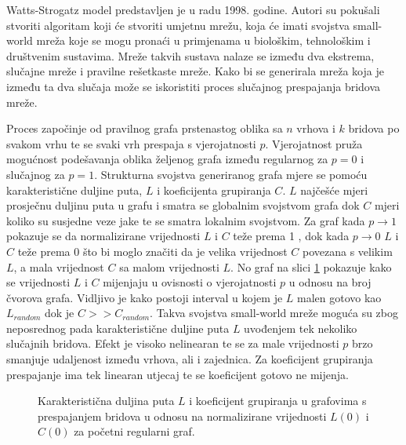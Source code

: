 Watts-Strogatz model predstavljen je u radu \cite{watts1998collective} 1998. godine. Autori su pokušali stvoriti algoritam koji će stvoriti umjetnu mrežu, koja će imati svojstva small-world mreža koje se mogu pronaći u primjenama u biološkim, tehnološkim i društvenim sustavima. Mreže takvih sustava nalaze se između dva ekstrema, slučajne mreže i pravilne rešetkaste mreže. Kako bi se generirala mreža koja je između ta dva slučaja može se iskoristiti proces slučajnog prespajanja bridova mreže. 

Proces započinje od pravilnog grafa prstenastog oblika sa $n$ vrhova i $k$ bridova po svakom vrhu te se svaki vrh prespaja s vjerojatnosti $p$. Vjerojatnost pruža mogućnost podešavanja oblika željenog grafa između regularnog za $p = 0$ i slučajnog za $p = 1$. Strukturna svojstva generiranog grafa mjere se pomoću karakteristične duljine puta, $L$ i koeficijenta grupiranja $C$. $L$ najčešće mjeri prosječnu duljinu puta u grafu i smatra se globalnim svojstvom grafa dok $C$ mjeri koliko su susjedne veze jake te se smatra lokalnim svojstvom. Za graf kada $p \rightarrow 1$ pokazuje se da normalizirane vrijednosti $L$ i $C$ teže prema 1 , dok kada $p \rightarrow 0$ $L$ i $C$ teže prema 0 što bi moglo značiti da je velika vrijednost $C$ povezana s velikim $L$, a mala vrijednost $C$ sa malom vrijednosti $L$. No graf na slici \ref{fig:C&L} pokazuje kako se vrijednosti $L$ i $C$ mijenjaju u ovisnosti o vjerojatnosti $p$ u odnosu na broj čvorova grafa. Vidljivo je kako postoji interval u kojem je $L$ malen gotovo kao $L_{random}$ dok je $C >> C_{random}$. Takva svojstva small-world mreže moguća su zbog neposrednog pada karakteristične duljine puta $L$ uvođenjem tek nekoliko slučajnih bridova. Efekt je visoko nelinearan te se za male vrijednosti $p$ brzo smanjuje udaljenost između vrhova, ali i zajednica. Za koeficijent grupiranja prespajanje ima tek linearan utjecaj te se koeficijent gotovo ne mijenja. 

\begin{figure}
	\caption{Karakteristična duljina puta $L$ i koeficijent grupiranja u grafovima s prespajanjem bridova u odnosu na normalizirane vrijednosti $L(0)$ i $C(0)$ za početni regularni graf.}
	\label{fig:C&L}
\end{figure}

